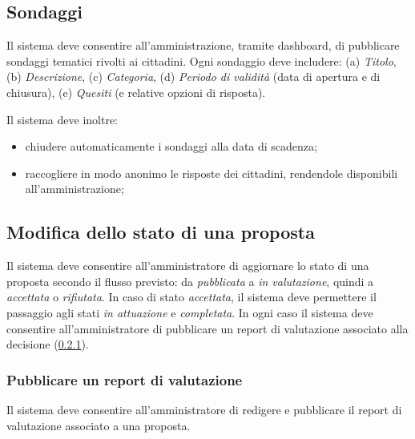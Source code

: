 \begin{rfscope}
\subsection{Sondaggi} \label{rf:sondaggi}
Il sistema deve consentire all’amministrazione, tramite dashboard, di pubblicare sondaggi tematici rivolti ai cittadini.
Ogni sondaggio deve includere:
(a) \emph{Titolo},
(b) \emph{Descrizione},
(c) \emph{Categoria},
(d) \emph{Periodo di validità} (data di apertura e di chiusura),
(e) \emph{Quesiti} (e relative opzioni di risposta).

Il sistema deve inoltre:
\begin{itemize}
	\item chiudere automaticamente i sondaggi alla data di scadenza;
	\item raccogliere in modo anonimo le risposte dei cittadini, rendendole disponibili all’amministrazione;
\end{itemize}

\subsection{Modifica dello stato di una proposta} \label{rf:modificastatoproposta}
Il sistema deve consentire all’amministratore di aggiornare lo stato di una proposta  secondo il flusso previsto: da \emph{pubblicata} a \emph{in valutazione}, quindi a \emph{accettata} o \emph{rifiutata}.
In caso di stato \emph{accettata}, il sistema deve permettere il passaggio agli stati \emph{in attuazione} e \emph{completata}.
In ogni caso il sistema deve consentire all’amministratore di pubblicare un report di valutazione associato alla decisione (\ref{rf:pubblicaportvalutazione}).

\subsubsection{Pubblicare un report di valutazione} \label{rf:pubblicaportvalutazione}
Il sistema deve consentire all’amministratore di redigere e pubblicare il report di valutazione associato a una proposta.



\end{rfscope}